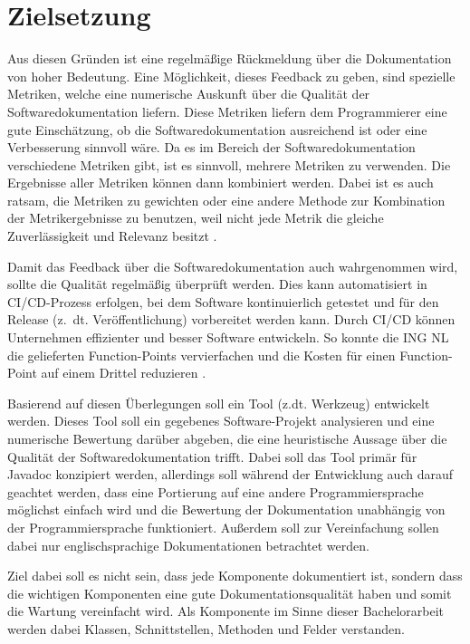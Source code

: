 \section{Zielsetzung}
Aus diesen Gründen ist eine regelmäßige Rückmeldung über die Dokumentation von hoher Bedeutung. Eine Möglichkeit, dieses Feedback zu geben, sind spezielle Metriken, welche eine numerische Auskunft über die Qualität der Softwaredokumentation liefern. Diese Metriken liefern dem Programmierer eine gute Einschätzung, ob die Softwaredokumentation ausreichend ist oder eine Verbesserung sinnvoll wäre. Da es im Bereich der Softwaredokumentation verschiedene Metriken gibt, ist es sinnvoll, mehrere Metriken zu verwenden. Die Ergebnisse aller Metriken können dann kombiniert werden. Dabei ist es auch ratsam, die Metriken zu gewichten oder eine andere Methode zur Kombination der Metrikergebnisse zu benutzen, weil nicht jede Metrik die gleiche Zuverlässigkeit und Relevanz besitzt \cite[S. 1117ff.]{Softwarequalitymetricsaggregationinindustry}.

Damit das Feedback über die Softwaredokumentation auch wahrgenommen wird, sollte die Qualität regelmäßig  überprüft werden. Dies kann automatisiert in \ac{CI/CD}-Prozess erfolgen, bei dem Software kontinuierlich getestet und für den Release (z.~dt. Veröffentlichung) vorbereitet werden kann. Durch CI/CD können Unternehmen effizienter und besser Software entwickeln. So konnte die ING NL die gelieferten Function-Points vervierfachen und die Kosten für einen Function-Point auf einem Drittel reduzieren \cite[S. 520]{Vassallo2016}.

Basierend auf diesen Überlegungen soll ein Tool (z.dt. Werkzeug) entwickelt werden. Dieses Tool soll ein gegebenes Software-Projekt analysieren und eine numerische Bewertung darüber abgeben, die eine heuristische Aussage über die Qualität der Softwaredokumentation trifft.  Dabei soll das Tool primär für Javadoc konzipiert werden, allerdings soll während der Entwicklung auch darauf geachtet werden, dass eine Portierung auf eine andere Programmiersprache möglichst einfach wird und die Bewertung der Dokumentation unabhängig von der Programmiersprache funktioniert. Außerdem soll zur Vereinfachung sollen dabei nur englischsprachige Dokumentationen betrachtet werden.

Ziel dabei soll es nicht sein, dass jede Komponente dokumentiert ist, sondern dass die wichtigen Komponenten eine gute Dokumentationsqualität haben und somit die Wartung vereinfacht wird.  Als Komponente im Sinne dieser Bachelorarbeit werden dabei Klassen, Schnittstellen, Methoden und Felder verstanden. 



